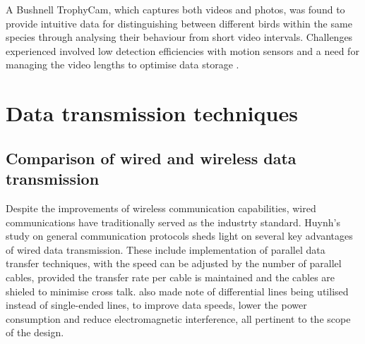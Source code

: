 \documentclass[class=report,11pt,crop=false]{standalone}
\begin{document}
A Bushnell TrophyCam, which captures both videos and photos, was found to provide intuitive data for distinguishing between different birds within the same species through analysing their behaviour from short video intervals. Challenges experienced involved low detection efficiencies with motion sensors and a need for managing the video lengths to optimise data storage \cite{ribeiro-silva2018testing}. 


\section{Data transmission techniques}

\subsection{Comparison of wired and wireless data transmission}

Despite the improvements of wireless communication capabilities, wired communications have traditionally served as the industrty standard. Huynh’s study on general communication protocols \cite{huynh2010study} sheds light on several key advantages of wired data transmission. These include implementation of parallel data transfer techniques, with the speed can be adjusted by the number of parallel cables, provided the transfer rate per cable is maintained and the cables are shieled to minimise cross talk. \cite{huynh2010study} also made note of differential lines being utilised instead of single-ended lines, to improve data speeds, lower the power consumption and reduce electromagnetic interference, all pertinent to the scope of the design.
\end{document}
